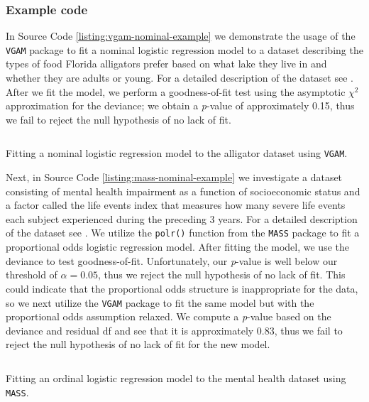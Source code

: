\documentclass{report}
\begin{document}
\subsubsection{Example code}

In Source Code \ref{listing:vgam-nominal-example} we demonstrate the usage of the \texttt{VGAM} package to fit a nominal logistic regression model to a dataset describing the types of food Florida alligators prefer based on what lake they live in and whether they are adults or young. For a detailed description of the dataset see \cite[Chapter~6.3.2]{agresti_foundations_2015}. After we fit the model, we perform a goodness-of-fit test using the asymptotic $\chi^2$ approximation for the deviance; we obtain a \textit{p}-value of approximately 0.15, thus we fail to reject the null hypothesis of no lack of fit. 

\begin{listing}[h!]
\inputminted{r}{Example-Code/nominal_logistic_regression.R}
\caption{Fitting a nominal logistic regression model to the alligator dataset using \texttt{VGAM}.}
\label{listing:vgam-nominal-example}
\end{listing}

Next, in Source Code \ref{listing:mass-nominal-example} we investigate a dataset consisting of mental health impairment as a function of socioeconomic status and a factor called the life events index that measures how many severe life events each subject experienced during the preceding 3 years. For a detailed description of the dataset see \cite[Chapter~6.3.3]{agresti_foundations_2015}. We utilize the \texttt{polr()} function from the \texttt{MASS} package to fit a proportional odds logistic regression model. After fitting the model, we use the deviance to test goodness-of-fit. Unfortunately, our \textit{p}-value is well below our threshold of $\alpha = 0.05$, thus we reject the null hypothesis of no lack of fit. This could indicate that the proportional odds structure is inappropriate for the data, so we next utilize the \texttt{VGAM} package to fit the same model but with the proportional odds assumption relaxed. We compute a \textit{p}-value based on the deviance and residual \gls{df} and see that it is approximately 0.83, thus we fail to reject the null hypothesis of no lack of fit for the new model. 

\begin{listing}[h!]
\inputminted{r}{Example-Code/ordinal_logistic_regression.R}
\caption{Fitting an ordinal logistic regression model to the mental health dataset using \texttt{MASS}.}
\label{listing:mass-nominal-example}
\end{listing}
\end{document}
